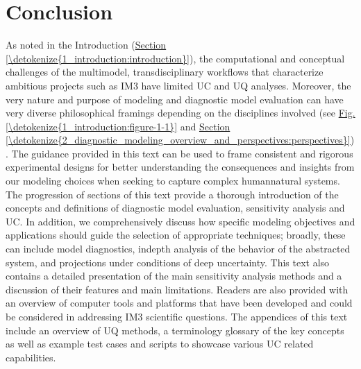 \documentclass[letterpaper,10pt,english]{sphinxmanual}
\begin{document}
\chapter{Conclusion}
\label{\detokenize{5_conclusion:conclusion}}\label{\detokenize{5_conclusion:id1}}\label{\detokenize{5_conclusion::doc}}
\sphinxAtStartPar
As noted in the Introduction (\hyperref[\detokenize{1_introduction:introduction}]{Section \ref{\detokenize{1_introduction:introduction}}}), the computational and conceptual challenges of the multi\sphinxhyphen{}model, transdisciplinary workflows that characterize ambitious projects such as IM3 have limited UC and UQ analyses. Moreover, the very nature and purpose of modeling and diagnostic model evaluation can have very diverse philosophical framings depending on the disciplines involved (see \hyperref[\detokenize{1_introduction:figure-1-1}]{Fig.\@ \ref{\detokenize{1_introduction:figure-1-1}}} and \hyperref[\detokenize{2_diagnostic_modeling_overview_and_perspectives:perspectives}]{Section \ref{\detokenize{2_diagnostic_modeling_overview_and_perspectives:perspectives}}}). The guidance provided in this text can be used to frame consistent and rigorous experimental designs for better understanding the consequences and insights from our modeling choices when seeking to capture complex human\sphinxhyphen{}natural systems. The progression of sections of this text provide a thorough introduction of the concepts and definitions of diagnostic model evaluation, sensitivity analysis and UC. In addition, we comprehensively discuss how specific modeling objectives and applications should guide the selection of appropriate techniques; broadly, these can include model diagnostics, in\sphinxhyphen{}depth analysis of the behavior of the abstracted system, and projections under conditions of deep uncertainty. This text also contains a detailed presentation of the main sensitivity analysis methods and a discussion of their features and main limitations. Readers are also provided with an overview of computer tools and platforms that have been developed and could be considered in addressing IM3 scientific questions. The appendices of this text include an overview of UQ methods, a terminology glossary of the key concepts as well as example test cases and scripts to showcase various UC related capabilities.
\end{document}
